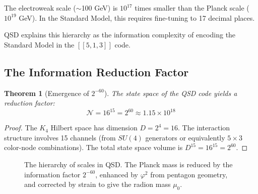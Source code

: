 \documentclass[11pt,a4paper]{article}
\newtheorem{theorem}{Theorem}[section]
\theoremstyle{definition}
\newcommand{\dgeo}{\delta}              %
\newcommand{\murad}{\mu_0}              %
\newcommand{\Mpl}{M_{\text{Pl}}}        %
\newcommand{\mH}{m_H}                   %
\begin{document}
The electroweak scale ($\sim$100 GeV) is $10^{17}$ times smaller than the Planck scale ($10^{19}$ GeV). In the Standard Model, this requires fine-tuning to 17 decimal places.

QSD explains this hierarchy as the information complexity of encoding the Standard Model in the $[[5,1,3]]$ code.

\subsection{The Information Reduction Factor}

\begin{theorem}[Emergence of $2^{-60}$]
The state space of the QSD code yields a reduction factor:
\begin{equation}
\mathcal{N} = 16^{15} = 2^{60} \approx 1.15 \times 10^{18}
\end{equation}
\end{theorem}

\begin{proof}
The $K_4$ Hilbert space has dimension $D = 2^4 = 16$. The interaction structure involves 15 channels (from $SU(4)$ generators or equivalently $5 \times 3$ color-node combinations). The total state space volume is $D^{15} = 16^{15} = 2^{60}$.
\end{proof}

\begin{figure}[h]
\centering
{}
\caption{The hierarchy of scales in QSD. The Planck mass is reduced by the information factor $2^{-60}$, enhanced by $\varphi^2$ from pentagon geometry, and corrected by strain to give the radion mass $\murad$.}
\label{fig:hierarchy}
\end{figure}
\end{document}

